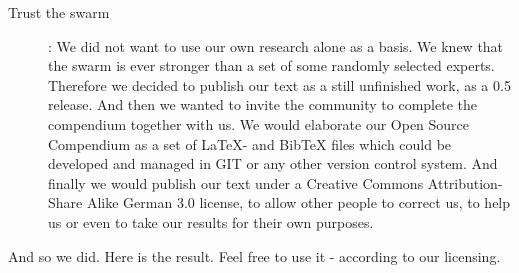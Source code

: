 \begin{description}
  \item[Trust the swarm]: We did not want to use our own research alone as a
  basis. We knew that the swarm is ever stronger than a set of some randomly
  selected experts. Therefore we decided to publish our text as a still
  unfinished work, as a 0.5 release. And then we wanted to invite the community
  to complete the compendium together with us. We would elaborate our Open
  Source Compendium as a set of LaTeX- and BibTeX files which could be developed
  and managed in GIT or any other version control system. And finally we would
  publish our text under a Creative Commons Attribution-Share Alike German 3.0
  license, to allow other people to correct
  us, to help us or even to take our results for their own purposes.
\end{description}

And so we did. Here is the result. Feel free to use it - according to our
licensing.

%
